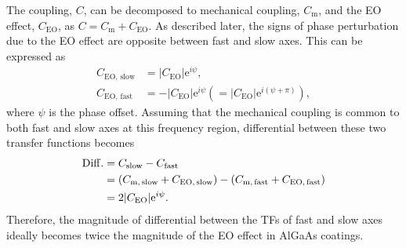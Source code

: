\documentclass[%
 reprint,
 superscriptaddress,
 amsmath,amssymb,
 aps,
]{revtex4-2}
\begin{document}
The coupling, $C$, can be decomposed to mechanical coupling, $C_{\mathrm{m}}$, and the EO effect, $C_{\mathrm{EO}}$, as $C=C_{\mathrm{m}}+C_{\mathrm{EO}}$.
As described later, the signs of phase perturbation due to the EO effect are opposite between fast and slow axes.
This can be expressed as
\begin{align}
    C_{\mathrm{EO,\,slow}} &= |C_{\mathrm{EO}}|\mathrm{e}^{i\psi}, \\
    C_{\mathrm{EO,\,fast}} &= -|C_{\mathrm{EO}}|\mathrm{e}^{i\psi} \left(=|C_{\mathrm{EO}}|\mathrm{e}^{i(\psi+\pi)}\right),
\end{align}
where $\psi$ is the phase offset.
Assuming that the mechanical coupling is common to both fast and slow axes at this frequency region, differential between these two transfer functions becomes
\begin{align}
    \mathrm{Diff.} &= C_{\mathrm{slow}} - C_{\mathrm{fast}}  \notag \\
    &= \left(C_{\mathrm{m,\,slow}}+C_{\mathrm{EO,\,slow}}\right) - \left(C_{\mathrm{m,\,fast}}+C_{\mathrm{EO,\,fast}}\right) \notag \\
    &= 2|C_{\mathrm{EO}}|\mathrm{e}^{i\psi}.
\end{align}
Therefore, the magnitude of differential between the TFs of fast and slow axes ideally becomes twice the magnitude of the EO effect in AlGaAs coatings.
\end{document}
